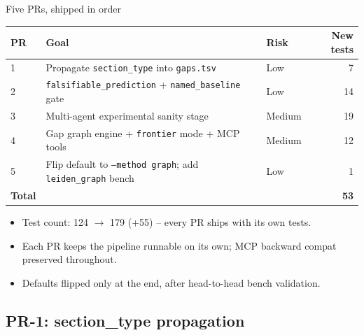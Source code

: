 \documentclass[10pt,aspectratio=169]{beamer}
\newcommand{\filename}[1]{\texttt{\small#1}}
\newcommand{\flag}[1]{\texttt{\small#1}}
\begin{document}
\begin{frame}{Five PRs, shipped in order}
  \begin{table}\centering\scriptsize
    \begin{tabular}{@{}lllr@{}}
      \toprule
      PR & Goal & Risk & New tests \\
      \midrule
      1 & Propagate \texttt{section\_type} into \filename{gaps.tsv}                  & Low    & 7  \\
      2 & \texttt{falsifiable\_prediction} + \texttt{named\_baseline} gate           & Low    & 14 \\
      3 & Multi-agent experimental sanity stage                                       & Medium & 19 \\
      4 & Gap graph engine + \texttt{frontier} mode + MCP tools                       & Medium & 12 \\
      5 & Flip default to \flag{--method graph}; add \texttt{leiden\_graph} bench    & Low    & 1  \\
      \midrule
      \textbf{Total} &                                                                 &        & \textbf{53} \\
      \bottomrule
    \end{tabular}
  \end{table}

  \vspace{1em}
  \begin{itemize}
    \item Test count: 124 $\to$ 179 (+55) -- every PR ships with its own tests.
    \item Each PR keeps the pipeline runnable on its own; MCP backward compat preserved throughout.
    \item Defaults flipped only at the end, after head-to-head bench validation.
  \end{itemize}
\end{frame}


\subsection{PR-1: section\_type propagation}
\end{document}

